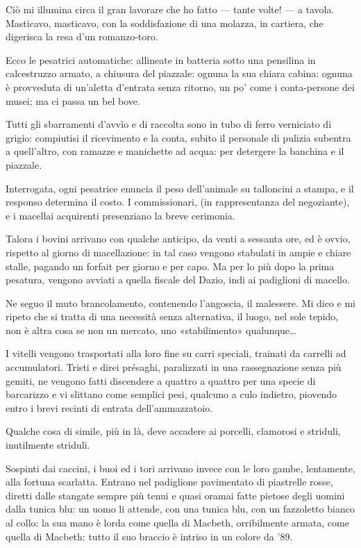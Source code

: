 Ciò mi illumina circa il gran lavorare che ho fatto — tante volte! — a tavola. Masticavo, masticavo, con la soddisfazione di una molazza, in cartiera, che digerisca la resa d’un romanzo-toro.

Ecco le pesatrici automatiche: allineate in batteria sotto una pensilina in calcestruzzo armato, a chiusura del piazzale: ognuna la sua chiara cabina: ognuna è provveduta di un’aletta d’entrata senza ritorno, un po’ come i conta-persone dei musei; ma ci passa un bel bove.

Tutti gli sbarramenti d’avvìo e di raccolta sono in tubo di ferro verniciato di grigio: compiutisi il ricevimento e la conta, subito il personale di pulizia subentra a quell’altro, con ramazze e manichette ad acqua: per detergere la banchina e il piazzale.

Interrogata, ogni pesatrice enuncia il peso dell’animale su talloncini a stampa, e il responso determina il costo. I commissionari, (in rappresentanza del negoziante), e i macellai acquirenti presenziano la breve cerimonia.

Talora i bovini arrivano con qualche anticipo, da venti a sessanta ore, ed è ovvio, rispetto al giorno di macellazione: in tal caso vengono stabulati in ampie e chiare stalle, pagando un forfait per giorno e per capo. Ma per lo più dopo la prima pesatura, vengono avviati a quella fiscale del Dazio, indi ai padiglioni di macello.

Ne seguo il muto brancolamento, contenendo l’angoscia, il malessere. Mi dico e mi ripeto che si tratta di una necessità senza alternativa, il luogo, nel sole tepido, non è altra cosa se non un mercato, uno «stabilimento» qualunque…

I vitelli vengono trasportati alla loro fine su carri speciali, trainati da carrelli ad accumulatori. Tristi e direi présaghi, paralizzati in una rassegnazione senza più gemiti, ne vengono fatti discendere a quattro a quattro per una specie di barcarizzo e vi slittano come semplici pesi, qualcuno a culo indietro, piovendo entro i brevi recinti di entrata dell’ammazzatoio.

Qualche cosa di simile, più in là, deve accadere ai porcelli, clamorosi e striduli, inutilmente striduli.

Sospinti dai caccini, i buoi ed i tori arrivano invece con le loro gambe, lentamente, alla fortuna scarlatta. Entrano nel padiglione pavimentato di piastrelle rosse, diretti dalle stangate sempre più tenui e quasi oramai fatte pietose degli uomini dalla tunica blu: un uomo li attende, con una tunica blu, con un fazzoletto bianco al collo: la sua mano è lorda come quella di Macbeth, orribilmente armata, come quella di Macbeth: tutto il suo braccio è intriso in un colore da ’89.


